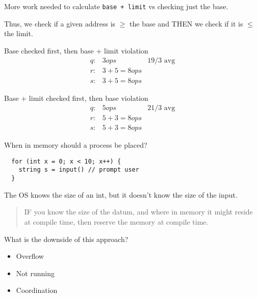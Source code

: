 \documentclass{article}
\begin{document}
More work needed to calculate \texttt{base + limit} vs checking just the base.

Thus, we check if a given address is \(\geq\) the base and THEN
we check if it is \(\leq\) the limit.

Base checked first, then base + limit violation
\begin{align*}
	q: & 3 ops         & 19/3 \text{ avg} \\
	r: & 3 + 5 = 8 ops                    \\
	s: & 3 + 5 = 8 ops
\end{align*}

Base + limit checked first, then base violation
\begin{align*}
	q: & 5 ops         & 21/3 \text{ avg} \\
	r: & 5 + 3 = 8 ops                    \\
	s: & 5 + 3 = 8 ops
\end{align*}

When in memory should a process be placed?
\begin{verbatim}
  for (int x = 0; x < 10; x++) {
    string s = input() // prompt user
  }
\end{verbatim}

The OS knows the size of an int, but it doesn't know the size of the input.

\begin{quote}
  IF you know the size of the datum, and where in memory it might reside at compile time, then reserve the memory at compile time.
\end{quote}

What is the downside of this approach?

\begin{itemize}
  \item Overflow
  \item Not running
  \item Coordination
\end{itemize}
\end{document}
